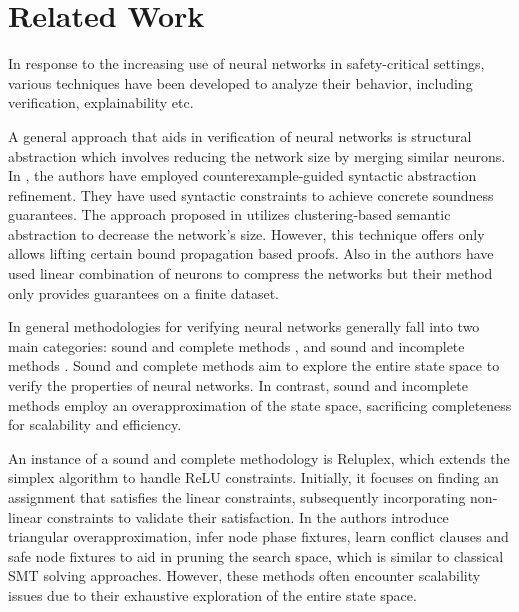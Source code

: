\section{Related Work}

In response to the increasing use of neural networks in safety-critical settings, 
various techniques have been developed to analyze their behavior, including 
verification, explainability etc. 

A general approach that aids in verification of neural networks
is structural abstraction which involves reducing the network size by 
merging similar neurons. In \cite {cegar-nn, cegarette}, the authors have 
employed counterexample-guided syntactic abstraction
refinement. 
They have used syntactic constraints to achieve concrete soundness guarantees.
The approach proposed in \cite{deep-abstract} utilizes clustering-based 
semantic abstraction to decrease the network's size. However, this technique 
offers only allows lifting certain bound propagation
based proofs. Also in \cite{lin-comb-abs-jan} the authors have used linear 
combination of neurons to compress the networks but their method only provides 
guarantees on a finite dataset. 

In general methodologies for verifying neural networks generally fall into two main
categories: sound and complete methods \cite{reluplex, formal-ver-piece-wise, 
comp-reachability-analysis, comp-milp, comp-out-range, comp-max-resilience, marabou,
comp-safety-ver-dnn, beta-crown, alpha-crown-bab-fnc, gcp-crown}, and sound and
incomplete methods \cite{deeppoly, crown, incomp-dual-approach, incomp-abs-inp, 
incomp-robustness-certi, incomp-boost-robustness}. Sound and complete methods aim to 
explore the entire state space to verify the properties of neural networks.
In contrast, sound and incomplete methods employ an overapproximation
of the state space, sacrificing completeness for 
scalability and efficiency.

An instance of a sound and complete methodology is Reluplex, which extends the 
simplex algorithm \cite{simplex} to 
handle ReLU constraints. Initially, it focuses on finding an assignment that 
satisfies the linear constraints, subsequently incorporating non-linear constraints 
to validate their satisfaction. In \cite{formal-ver-piece-wise}
the authors introduce triangular overapproximation, infer node phase fixtures,
learn conflict clauses and safe node fixtures to aid in pruning the search 
space, which is similar to classical SMT solving approaches. However, these methods
often encounter scalability issues due to their exhaustive exploration of the
entire state space. 

